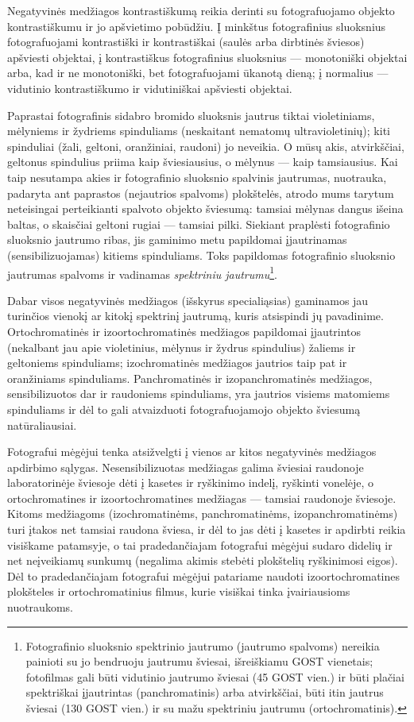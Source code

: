 \documentclass{book}
\begin{document}
					Negatyvinės medžiagos kontrastiškumą reikia derinti su fotografuojamo objekto kontrastiškumu ir jo apšvietimo pobūdžiu. Į minkštus fotografinius sluoksnius fotografuojami kontrastiški ir kontrastiškai (saulės arba dirbtinės šviesos) apšviesti objektai, į kontrastiškus fotografinius sluoksnius --- monotoniški objektai arba, kad ir ne monotoniški, bet fotografuojami ūkanotą dieną; į normalius --- vidutinio kontrastiškumo ir vidutiniškai apšviesti objektai.

					Paprastai fotografinis sidabro bromido sluoksnis jautrus tiktai violetiniams, mėlyniems ir žydriems spinduliams (neskaitant nematomų ultravioletinių); kiti spinduliai (žali, geltoni, oranžiniai, raudoni) jo neveikia. O mūsų akis, atvirkščiai, geltonus spindulius priima kaip šviesiausius, o mėlynus --- kaip tamsiausius. Kai taip nesutampa akies ir fotografinio sluoksnio spalvinis jautrumas, nuotrauka, padaryta ant paprastos (nejautrios spalvoms) plokštelės, atrodo mums tarytum neteisingai perteikianti spalvoto objekto šviesumą: tamsiai mėlynas dangus išeina baltas, o skaisčiai geltoni rugiai --- tamsiai pilki. Siekiant praplėsti fotografinio sluoksnio jautrumo ribas, jis gaminimo metu papildomai įjautrinamas (sensibilizuojamas) kitiems spinduliams. Toks papildomas fotografinio sluoksnio jautrumas spalvoms ir vadinamas \textit{spektriniu jautrumu}\footnote{Fotografinio sluoksnio spektrinio jautrumo (jautrumo spalvoms) nereikia painioti su jo bendruoju jautrumu šviesai, išreiškiamu GOST vienetais; fotofilmas gali būti vidutinio jautrumo šviesai (45 GOST vien.) ir būti plačiai spektriškai įjautrintas (panchromatinis) arba atvirkščiai, būti itin jautrus šviesai (130 GOST vien.) ir su mažu spektriniu jautrumu (ortochromatinis).}.

					Dabar visos negatyvinės medžiagos (išskyrus specialiąsias) gaminamos jau turinčios vienokį ar kitokį spektrinį jautrumą, kuris atsispindi jų pavadinime. Ortochromatinės ir izoortochromatinės medžiagos papildomai įjautrintos (nekalbant jau apie violetinius, mėlynus ir žydrus spindulius) žaliems ir geltoniems spinduliams; izochromatinės medžiagos jautrios taip pat ir oranžiniams spinduliams. Panchromatinės ir izopanchromatinės medžiagos, sensibilizuotos dar ir raudoniems spinduliams, yra jautrios visiems matomiems spinduliams ir dėl to gali atvaizduoti fotografuojamojo objekto šviesumą natūraliausiai.

					Fotografui mėgėjui tenka atsižvelgti į vienos ar kitos negatyvinės medžiagos apdirbimo sąlygas. Nesensibilizuotas medžiagas galima šviesiai raudonoje laboratorinėje šviesoje dėti į kasetes ir ryškinimo indelį, ryškinti vonelėje, o ortochromatines ir izoortochromatines medžiagas --- tamsiai raudonoje šviesoje. Kitoms medžiagoms (izochromatinėms, panchromatinėms, izopanchromatinėms) turi įtakos net tamsiai raudona šviesa, ir dėl to jas dėti į kasetes ir apdirbti reikia visiškame patamsyje, o tai pradedančiajam fotografui mėgėjui sudaro didelių ir net neįveikiamų sunkumų (negalima akimis stebėti plokštelių ryškinimosi eigos). Dėl to pradedančiajam fotografui mėgėjui patariame naudoti izoortochromatines plokšteles ir ortochromatinius filmus, kurie visiškai tinka įvairiausioms nuotraukoms.
\end{document}
